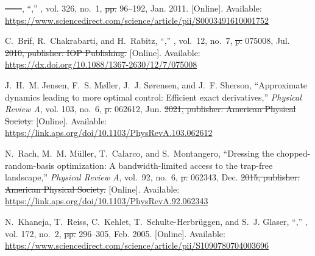 \documentclass[a4paper,oneside,11pt]{book}
\providecommand{\DIFaddtex}[1]{{\protect\color{blue}\uwave{#1}}} %
\providecommand{\DIFdeltex}[1]{{\protect\color{red}\sout{#1}}}                      %
\providecommand{\DIFaddbegin}{} %
\providecommand{\DIFaddend}{} %
\providecommand{\DIFdelbegin}{} %
\providecommand{\DIFdelend}{} %
\providecommand{\DIFadd}[1]{\texorpdfstring{\DIFaddtex{#1}}{#1}} %
\providecommand{\DIFdel}[1]{\texorpdfstring{\DIFdeltex{#1}}{}} %
\newcommand{\DIFscaledelfig}{0.5}
\newlength{\DIFdelgraphicswidth} %
\newlength{\DIFdelgraphicsheight} %
\newcommand{\DIFaddincludegraphics}[2][]{{\color{blue}\fbox{\DIFOincludegraphics[#1]{#2}}}} %
\newcommand{\DIFdelincludegraphics}[2][]{%
\sbox{\DIFdelgraphicsbox}{\DIFOincludegraphics[#1]{#2}}%
\settoboxwidth{\DIFdelgraphicswidth}{\DIFdelgraphicsbox} %
\settoboxtotalheight{\DIFdelgraphicsheight}{\DIFdelgraphicsbox} %
\scalebox{\DIFscaledelfig}{%
\parbox[b]{\DIFdelgraphicswidth}{\usebox{\DIFdelgraphicsbox}\\[-\baselineskip] \rule{\DIFdelgraphicswidth}{0em}}\llap{\resizebox{\DIFdelgraphicswidth}{\DIFdelgraphicsheight}{%
\setlength{\unitlength}{\DIFdelgraphicswidth}%
\begin{picture}(1,1)%
\thicklines\linethickness{2pt} %
{\color[rgb]{1,0,0}\put(0,0){\framebox(1,1){}}}%
{\color[rgb]{1,0,0}\put(0,0){\line( 1,1){1}}}%
{\color[rgb]{1,0,0}\put(0,1){\line(1,-1){1}}}%
\end{picture}%
}\hspace*{3pt}}} %
} %
\DeclareRobustCommand{\DIFaddbegin}{\DIFOaddbegin \let\includegraphics\DIFaddincludegraphics} %
\DeclareRobustCommand{\DIFaddend}{\DIFOaddend \let\includegraphics\DIFOincludegraphics} %
\DeclareRobustCommand{\DIFdelbegin}{\DIFOdelbegin \let\includegraphics\DIFdelincludegraphics} %
\DeclareRobustCommand{\DIFdelend}{\DIFOaddend \let\includegraphics\DIFOincludegraphics} %
\begin{document}
\begin{thebibliography}{100}
\BIBentryALTinterwordspacing
\DIFdelbegin \DIFdel{------}\DIFdelend \DIFaddbegin \DIFadd{U.~Schollwöck}\DIFaddend , ``,''
  \emph{}, vol. 326, no.~1,  \DIFdelbegin \DIFdel{pp. }\DIFdelend 96--192,
  Jan. 2011. [Online]. Available:
  \url{https://www.sciencedirect.com/science/article/pii/S0003491610001752}
\BIBentrySTDinterwordspacing

\BIBentryALTinterwordspacing
C.~Brif, R.~Chakrabarti, and H.~Rabitz, ``,''
  \emph{}, vol.~12, no.~7,
  \DIFdelbegin \DIFdel{p.
  }\DIFdelend 075008, Jul. \DIFdelbegin \DIFdel{2010, publisher: IOP Publishing. }\DIFdelend \DIFaddbegin \DIFadd{2010. }\DIFaddend [Online]. Available:
  \url{https://dx.doi.org/10.1088/1367-2630/12/7/075008}
\BIBentrySTDinterwordspacing

\BIBentryALTinterwordspacing
J.~H.~M. Jensen, F.~S. Møller, J.~J. Sørensen, and J.~F. Sherson,
  ``Approximate dynamics leading to more optimal control: {Efficient} exact
  derivatives,'' \emph{Physical Review A}, vol. 103, no.~6,  \DIFdelbegin \DIFdel{p. }\DIFdelend 062612, Jun. \DIFdelbegin \DIFdel{2021, publisher: American Physical Society. }\DIFdelend \DIFaddbegin \DIFadd{2021.
  }\DIFaddend [Online]. Available:
  \url{https://link.aps.org/doi/10.1103/PhysRevA.103.062612}
\BIBentrySTDinterwordspacing

\BIBentryALTinterwordspacing
N.~Rach, M.~M. Müller, T.~Calarco, and S.~Montangero, ``Dressing the
  chopped-random-basis optimization: {A} bandwidth-limited access to the
  trap-free landscape,'' \emph{Physical Review A}, vol.~92, no.~6,  \DIFdelbegin \DIFdel{p. }\DIFdelend 062343,
  Dec. \DIFdelbegin \DIFdel{2015, publisher: American Physical Society. }\DIFdelend \DIFaddbegin \DIFadd{2015. }\DIFaddend [Online]. Available:
  \url{https://link.aps.org/doi/10.1103/PhysRevA.92.062343}
\BIBentrySTDinterwordspacing

\BIBentryALTinterwordspacing
N.~Khaneja, T.~Reiss, C.~Kehlet, T.~Schulte-Herbrüggen, and S.~J. Glaser,
  ``,''
  \emph{}, vol. 172,
  no.~2,  \DIFdelbegin \DIFdel{pp. }\DIFdelend 296--305, Feb. 2005. [Online]. Available:
  \url{https://www.sciencedirect.com/science/article/pii/S1090780704003696}
\BIBentrySTDinterwordspacing


\end{thebibliography}
\end{document}
